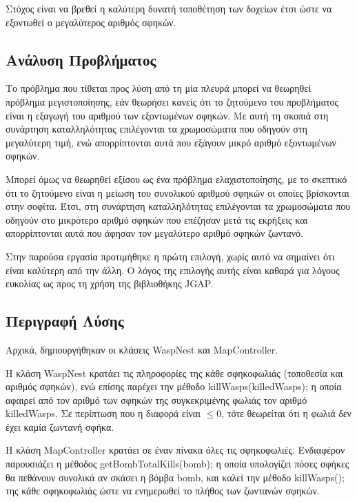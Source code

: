 Στόχος είναι να βρεθεί η καλύτερη δυνατή τοποθέτηση των δοχείων έτσι ώστε να εξοντωθεί ο μεγαλύτερος αριθμός σφηκών.

\subsection{Ανάλυση Προβλήματος}

Το πρόβλημα που τίθεται προς λύση από τη μία πλευρά μπορεί να θεωρηθεί πρόβλημα μεγιστοποίησης, εάν θεωρήσει κανείς ότι το ζητούμενο του προβλήματος είναι η εξαγωγή του αριθμού των εξοντωμένων σφηκών. Με αυτή τη σκοπιά στη συνάρτηση καταλληλότητας επιλέγονται τα χρωμοσώματα που οδηγούν στη μεγαλύτερη τιμή, ενώ απορρίπτονται αυτά που εξάγουν μικρό αριθμό εξοντωμένων σφηκών.

Μπορεί όμως να θεωρηθεί εξίσου ως ένα πρόβλημα ελαχιστοποίησης, με το σκεπτικό ότι το ζητούμενο είναι η μείωση του συνολικού αριθμού σφηκών οι οποίες βρίσκονται στην σοφίτα. Έτσι, στη συνάρτηση καταλληλότητας επιλέγονται τα χρωμοσώματα που οδηγούν στο μικρότερο αριθμό σφηκών που επέζησαν μετά τις εκρήξεις και απορρίπτονται αυτά που άφησαν τον μεγαλύτερο αριθμό σφηκών ζωντανό.

Στην παρούσα εργασία προτιμήθηκε η πρώτη επιλογή, χωρίς αυτό να σημαίνει ότι είναι καλύτερη από την άλλη. Ο λόγος της επιλογής αυτής είναι καθαρά για λόγους ευκολίας ως προς τη χρήση της βιβλιοθήκης JGAP.

\subsection{Περιγραφή Λύσης}

Αρχικά, δημιουργήθηκαν οι κλάσεις WaspNest και Map\-Controller.

Η κλάση WaspNest κρατάει τις πληροφορίες της κάθε σφηκοφωλιάς (τοποθεσία και αριθμός σφηκών), ενώ επίσης παρέχει την μέθοδο killWasps(killedWasps); η οποία αφαιρεί από τον αριθμό των σφηκών της συγκεκριμένης φωλιάς τον αριθμό killedWasps. Σε περίπτωση που η διαφορά είναι $\leq 0$, τότε θεωρείται ότι η φωλιά δεν έχει καμία ζωντανή σφήκα.

Η κλάση MapController κρατάει σε έναν πίνακα όλες τις σφηκοφωλιές. Ενδιαφέρον παρουσιάζει η μέθοδος getBomb\-TotalKills(bomb); η οποία υπολογίζει πόσες σφήκες θα πεθάνουν συνολικά αν σκάσει η βόμβα bomb, και καλεί την μέθοδο killWasps(); της κάθε σφηκοφωλιάς ώστε να ενημερωθεί το πλήθος των ζωντανών σφηκών.

